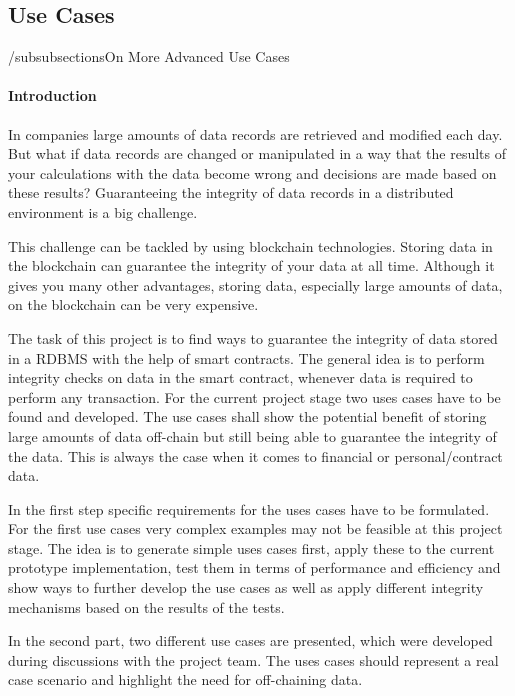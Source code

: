 \subsection{Use Cases}



/subsubsections{On More Advanced Use Cases}

\paragraph{Introduction}
In companies large amounts of data records are retrieved and modified each day. But what if data records are changed or manipulated in a way that the results of your calculations with the data become wrong and decisions are made based on these results? Guaranteeing the integrity of data records in a distributed environment is a big challenge.

This challenge can be tackled by using blockchain technologies. Storing data in the blockchain can guarantee the integrity of your data at all time. Although it gives you many other advantages, storing data, especially large amounts of data, on the blockchain can be very expensive.

The task of this project is to find ways to guarantee the integrity of data stored in a RDBMS with the help of smart contracts. The general idea is to perform integrity checks on data in the smart contract, whenever data is required to perform any transaction. For the current project stage two uses cases have to be found and developed. The use cases shall show the potential benefit of storing large amounts of data off-chain but still being able to guarantee the integrity of the data. This is always the case when it comes to financial or personal/contract data.

In the first step specific requirements for the uses cases have to be formulated. For the first use cases very complex examples may not be feasible at this project stage. The idea is to generate simple uses cases first, apply these to the current prototype implementation, test them in terms of performance and efficiency and show ways to further develop the use cases as well as apply different integrity mechanisms based on the results of the tests.

In the second part, two different use cases are presented, which were developed during discussions with the project team. The uses cases should represent a real case scenario and highlight the need for off-chaining data.

